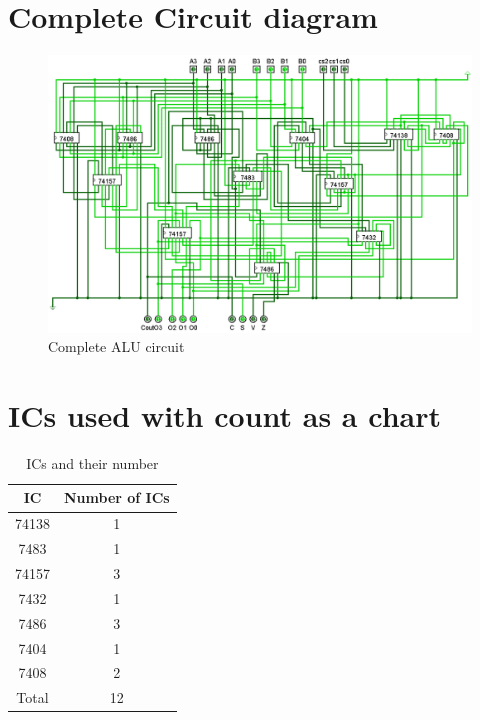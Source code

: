 \documentclass[18pt]{article}
\begin{document}
\section{Complete Circuit diagram}

\vspace{5mm}
\begin{figure}[!h]
    \centering
    \captionsetup{font=Large}
    \includegraphics[width=\textwidth]{Util/main.png}
    \caption{Complete ALU circuit}
    \label{fig:enter-label}
\end{figure}
\newpage

\section{ICs used with count as a chart}

\begin{table}[!h]
    \captionsetup{font=Large}
    \centering
    \begin{tabular}{||c|c||}
    \hline
        \textbf{IC} & \textbf{Number of ICs} \\
        \hline
        74138 & 1 \\
        7483 & 1 \\
        74157 & 3 \\
        7432 & 1 \\
        7486 & 3 \\
        7404 & 1 \\
        7408 & 2 \\
    \hline
    \hline
        Total & 12 \\
    \hline
    \end{tabular}
    \caption{ICs and their number}
    \label{tab:ic-number}
\end{table}
\end{document}
